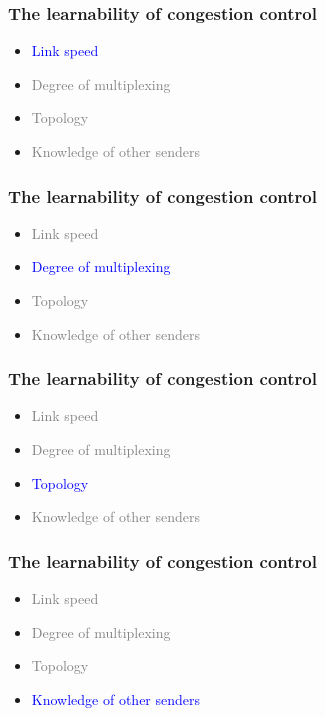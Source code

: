 \documentclass[svgnames]{beamer}
\begin{document}
\begin{Large}
\begin{frame}
\frametitle{The learnability of congestion control}
\begin{itemize}
\item \textcolor{blue}{Link speed}
\item \textcolor{gray}{Degree of multiplexing}
\item \textcolor{gray}{Topology}
\item \textcolor{gray}{Knowledge of other senders}
\end{itemize}
\end{frame}



\begin{frame}
\frametitle{The learnability of congestion control}
\begin{itemize}
\item \textcolor{gray}{Link speed}
\item \textcolor{blue}{Degree of multiplexing}
\item \textcolor{gray}{Topology}
\item \textcolor{gray}{Knowledge of other senders}
\end{itemize}
\end{frame}



\begin{frame}
\frametitle{The learnability of congestion control}
\begin{itemize}
\item \textcolor{gray}{Link speed}
\item \textcolor{gray}{Degree of multiplexing}
\item \textcolor{blue}{Topology}
\item \textcolor{gray}{Knowledge of other senders}
\end{itemize}
\end{frame}

 

\begin{frame}
\frametitle{The learnability of congestion control}
\begin{itemize}
\item \textcolor{gray}{Link speed}
\item \textcolor{gray}{Degree of multiplexing}
\item \textcolor{gray}{Topology}
\item \textcolor{blue}{Knowledge of other senders}
\end{itemize}
\end{frame}


\end{Large}
\end{document}

